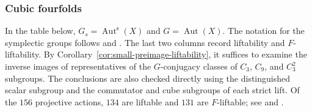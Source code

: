 \documentclass[12pt]{amsart}
\numberwithin{equation}{section}
\theoremstyle{plain}
\theoremstyle{definition}
\theoremstyle{remark}
\DeclareMathOperator{\Aut}{Aut}
\newcommand{\Auts}{\Aut^{\mathrm s}}
\begin{document}
\subsubsection{Cubic fourfolds}

In the table below, $G_s=\Auts(X)$ and $G=\Aut(X)$.  The notation for the
symplectic groups follows \cite[Theorem~1.2]{laza2022automorphisms} and
\cite[\S2]{KOIKE202512}.
The last two columns record liftability and $F$-liftability. By
Corollary~\ref{cor:small-preimage-liftability}, it suffices to examine the
inverse images of representatives of the $G$-conjugacy classes of
$C_3$, $C_9$, and $C_3^2$ subgroups.  The conclusions are also checked
directly using the distinguished scalar subgroup and the commutator and
cube subgroups of each strict lift.  Of the $156$ projective actions,
$134$ are liftable and $131$ are $F$-liftable; see
\cite{FuWangZhengAutcub4fold2026} and .
\end{document}
